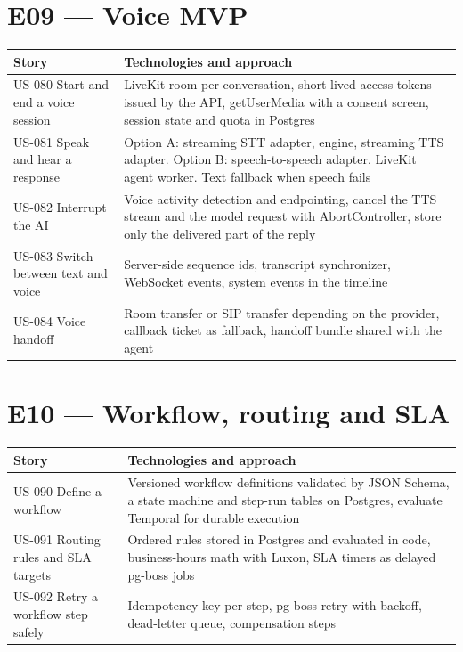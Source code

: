 \section{E09 --- Voice MVP}

{\small
\begin{longtable}{@{}>{\raggedright\arraybackslash}p{}>{\raggedright\arraybackslash}p{}@{}}
\toprule
\textbf{Story} & \textbf{Technologies and approach} \\
\midrule
\endhead
\bottomrule
\endfoot
US-080 Start and end a voice session & LiveKit room per conversation, short-lived access tokens issued by the API, getUserMedia with a consent screen, session state and quota in Postgres \\
US-081 Speak and hear a response & Option A: streaming STT adapter, engine, streaming TTS adapter. Option B: speech-to-speech adapter. LiveKit agent worker. Text fallback when speech fails \\
US-082 Interrupt the AI & Voice activity detection and endpointing, cancel the TTS stream and the model request with AbortController, store only the delivered part of the reply \\
US-083 Switch between text and voice & Server-side sequence ids, transcript synchronizer, WebSocket events, system events in the timeline \\
US-084 Voice handoff & Room transfer or SIP transfer depending on the provider, callback ticket as fallback, handoff bundle shared with the agent \\
\end{longtable}
}

\section{E10 --- Workflow, routing and SLA}

{\small
\begin{longtable}{@{}>{\raggedright\arraybackslash}p{}>{\raggedright\arraybackslash}p{}@{}}
\toprule
\textbf{Story} & \textbf{Technologies and approach} \\
\midrule
\endhead
\bottomrule
\endfoot
US-090 Define a workflow & Versioned workflow definitions validated by JSON Schema, a state machine and step-run tables on Postgres, evaluate Temporal for durable execution \\
US-091 Routing rules and SLA targets & Ordered rules stored in Postgres and evaluated in code, business-hours math with Luxon, SLA timers as delayed pg-boss jobs \\
US-092 Retry a workflow step safely & Idempotency key per step, pg-boss retry with backoff, dead-letter queue, compensation steps \\
\end{longtable}
}

